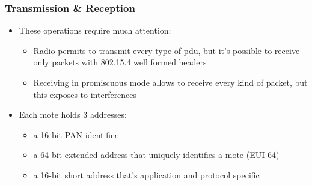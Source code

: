\begin{frame}[fragile]
  \frametitle{Transmission \& Reception}
  \begin{itemize}
    \item These operations require much attention:
    \begin{itemize}
    	\item Radio permits to transmit every type of pdu, but it's possible to receive only packets with 802.15.4 well formed headers
    	\item Receiving in promiscuous mode allows to receive every kind of packet, but this exposes to interferences
    \end{itemize}
    \item Each mote holds 3 addresses:
    \begin{itemize}
    	\item a 16-bit PAN identifier
    	\item a 64-bit extended address that uniquely identifies a mote (EUI-64)
    	\item a 16-bit short address that's application and protocol specific
    \end{itemize}
  \end{itemize}
\end{frame}

